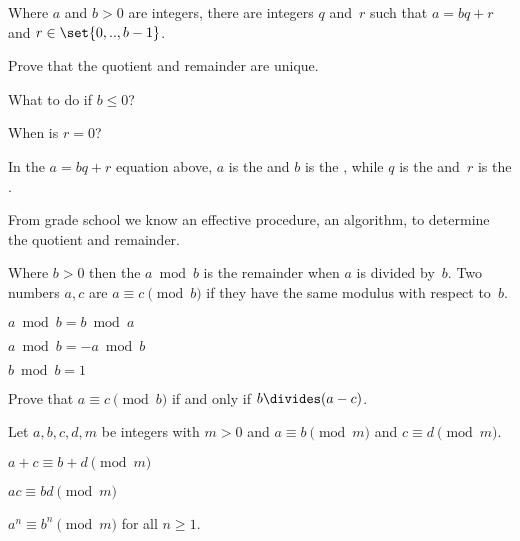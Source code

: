 \documentclass{ibl}
\begin{document}
\begin{ex}
\begin{exes}
\item Where $a$ and $b>0$ are integers, there are integers $q$ and~$r$
such
that $a=bq+r$ and
$r\in\set{0,..,b-1}$.
\item
Prove that the quotient and remainder are unique.
\item 
What to do if $b\leq 0$?
\end{exes}
\end{ex}

\begin{ex}
When is $r=0$? 
\end{ex}

\begin{df}
In the $a=bq+r$ equation above, $a$ is the  and
$b$ is the , while 
$q$ is the  and~$r$ is the .  
\end{df}

From grade school we know an effective procedure, an algorithm, to 
determine the quotient and remainder.

\begin{df}
Where $b>0$ then the  $a\bmod b$ 
is the remainder when $a$ is divided by~$b$.
Two numbers $a,c$ are  $a\equiv c\pmod b$ 
if they have the same modulus with respect to~$b$.
\end{df}

\begin{ex}\pord
\begin{exes}
\item $a\bmod b=b\bmod a$
\item $a\bmod b=-a\bmod b$
\item $b\bmod b=1$    
\end{exes}
\end{ex}

\begin{ex}
Prove that $a\equiv c\pmod b$ if and only if $b\divides (a-c)$.  
\end{ex}

\begin{ex}
Let $a,b,c,d,m$ be integers with $m>0$ and
$a\equiv b\pmod m$ and $c\equiv d\pmod m$.
\begin{exes}
\item $a+c\equiv b+d\pmod m$
\item $ac\equiv bd\pmod m$
\item $a^n\equiv b^n\pmod m$ for all $n\geq 1$.    
\end{exes}
\end{ex}
\end{document}
